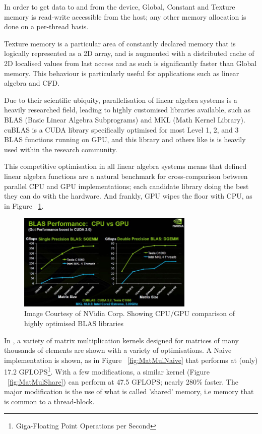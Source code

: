 In order to get data to and from the device, Global, Constant and Texture memory is read-write accessible from the host; any other memory allocation is done on a per-thread basis.

Texture memory is a particular area of constantly declared memory that is logically represented as a 2D array, and is augmented with a distributed cache of 2D localised values from last access and as such is significantly faster than Global memory. This behaviour is particularly useful for applications such as linear algebra and CFD.

Due to their scientific ubiquity, parallelisation of linear algebra systems is a heavily researched field, leading to highly customised libraries available, such as BLAS (Basic Linear Algebra Subprograms) and MKL (Math Kernel Library). cuBLAS is a CUDA library specifically optimised for most Level 1, 2, and 3 BLAS functions running on GPU, and this library and others like is is heavily used within the research community\cite{MF08}.

This competitive optimisation in all linear algebra systems means that defined linear algebra functions are a natural benchmark for cross-comparison between parallel CPU and GPU implementations; each candidate library doing the best they can do with the hardware. And frankly, GPU wipes the floor with CPU, as in Figure ~\ref{fig:BLASComp}.

\begin{figure}[h!]
\centering
    \includegraphics[width=0.75\textwidth,keepaspectratio=true]{images/NVDA_BLAS_C1060_vs_CPU_675.png}
  \caption{Image Courtesy of NVidia Corp. Showing CPU/GPU comparison of highly optimised BLAS libraries}
  \label{fig:BLASComp}
\end{figure}

In \cite{DBK10}, a variety of matrix multiplication kernels designed for matrices of many thousands of elements are shown with a variety of optimisations. A Naive implementation is shown, as in Figure ~\ref{fig:MatMulNaive} that performs at (only) 17.2 GFLOPS\footnote{Giga-Floating Point Operations per Second}. With a few modifications, a similar kernel (Figure ~\ref{fig:MatMulShare}) can perform at 47.5 GFLOPS; nearly 280\% faster. The major modification is the use of what is called 'shared' memory, i.e memory that is common to a thread-block.

